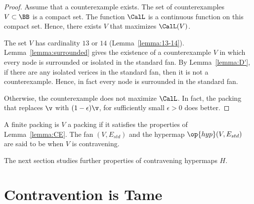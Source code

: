 \begin{proof} Assume that a counterexample exists.  The set of
  counterexamples $V\subset\BB$ is a compact set.  The function
  $\CalL$ is a continuous function on this compact set.  Hence, there
  exists $V$ that maximizes $\CalL(V)$.

  The set $V$ has cardinality $13$ or $14$
  (Lemma~\ref{lemma:13-14}). Lemma~\ref{lemma:surrounded} gives the
  existence of a counterexample $V$ in which every node is
  surrounded or isolated in the standard fan.  By
  Lemma~\ref{lemma:D'}, if there are any isolated verices in the
  standard fan, then it is not a counterexample.  Hence, in fact every
  node is surrounded in the standard fan.

    Otherwise, the counterexample does not
  maximize $\CalL$.  In fact, the packing that replaces $\v$ with $(1-\epsilon)\v$,
for sufficiently small $\epsilon>0$ does better.
\end{proof}


\begin{definition}[contravening]
  A finite packing is $V$ a  packing if it
  satisfies the properties of Lemma~\ref{lemma:CE}.  The fan
  $(V,E_{std})$ and the hypermap $\op{hyp}(V,E_{std})$ are said to be
   when $V$ is contravening.
\end{definition}



The next section studies further properties of contravening hypermaps $H$.



\section{Contravention is Tame}
%
\label{sec:contraproof}

